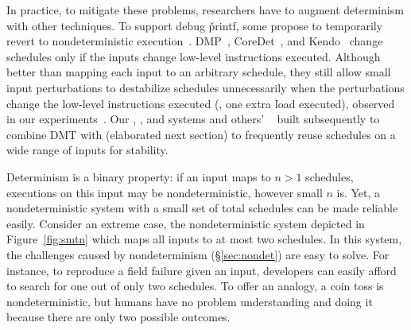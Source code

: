 In practice, to mitigate these problems, researchers have to augment
determinism with other techniques.  To support debug \v{printf}, some
propose to temporarily revert to nondeterministic
execution~\cite{dmp:asplos09}.  DMP~\cite{dmp:asplos09},
CoreDet~\cite{coredet:asplos10}, and Kendo~\cite{kendo:asplos09} change
schedules only if the inputs change low-level instructions executed.
Although better than mapping each input to an arbitrary schedule, they
still allow small input perturbations to destabilize schedules
unnecessarily when the perturbations change the low-level instructions
executed (\eg, one extra \v{load} executed), observed in our
experiments~\cite{cui:tern:osdi10}. Our \tern, \peregrine, and \parrot systems and others'
\dthreads~\cite{dthreads:sosp11} built subsequently to \tern combine DMT
with \smt (elaborated next section) to frequently reuse schedules on a
wide range of inputs for stability.



 Determinism
is a binary property: if
an input maps to $n > 1$ schedules, executions on this input may be
nondeterministic, however small $n$ is.  Yet, a nondeterministic system
with a small set of total schedules can be made reliable easily.  Consider an
extreme case, the nondeterministic system depicted in
Figure~\ref{fig:smtn} which maps all inputs to at most two schedules.  In this
system, the challenges caused by nondeterminism (\S\ref{sec:nondet}) are
easy to solve.  For instance, to reproduce a field failure given an input,
developers can easily afford to search for one out of only two schedules.
To offer an analogy, a coin toss is nondeterministic, but humans have
no problem understanding and doing it because there are only two possible
outcomes.

